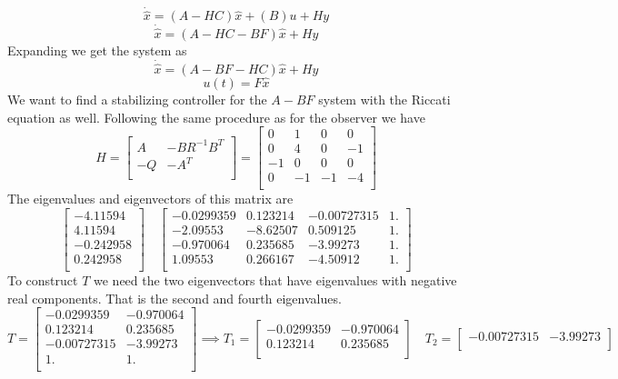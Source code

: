\documentclass{article}
\begin{document}
\begin{enumerate}[(a)]
$$ \dot{\hat{x}} = (A - HC)\hat{x} + (B)u +Hy $$
$$ \dot{\hat{x}} = (A - HC - BF)\hat{x} +Hy $$
Expanding we get the system as
$$ \dot{\hat{x}} = (A - BF - HC)\hat{x} +Hy $$
$$ u(t) = F\hat{x} $$
We want to find a stabilizing controller for the $A-BF$ system with the Riccati equation as well.
Following the same procedure as for the observer we have
$$
H =
\begin{bmatrix}
A & -BR^{-1}B^T \\
-Q & -A^T \\
\end{bmatrix}
=
\begin{bmatrix}
0 & 1 & 0 & 0 \\
0 & 4 & 0 & -1 \\
-1 & 0 & 0 & 0 \\
0 & -1 & -1 & -4 \\
\end{bmatrix}
$$
The eigenvalues and eigenvectors of this matrix are
$$
\begin{bmatrix}
-4.11594 \\
 4.11594 \\
-0.242958 \\
0.242958 \\
\end{bmatrix}
\quad
\begin{bmatrix}
-0.0299359 & 0.123214 & -0.00727315 & 1. \\
-2.09553 & -8.62507 & 0.509125 & 1. \\
-0.970064 & 0.235685 & -3.99273 & 1. \\
1.09553 & 0.266167 & -4.50912 & 1. \\
\end{bmatrix}
$$
To construct $T$ we need the two eigenvectors that have eigenvalues with negative real components.
That is the second and fourth eigenvalues.
$$
T =
\begin{bmatrix}
-0.0299359 & -0.970064 \\
0.123214 & 0.235685 \\
-0.00727315 & -3.99273 \\
1. & 1. \\
\end{bmatrix}
\implies T_1 =
\begin{bmatrix}
-0.0299359 & -0.970064 \\
0.123214 & 0.235685 \\
\end{bmatrix}
\quad T_2 =
\begin{bmatrix}
-0.00727315 & -3.99273 \\

\end{bmatrix}$$
\end{enumerate}
\end{document}

